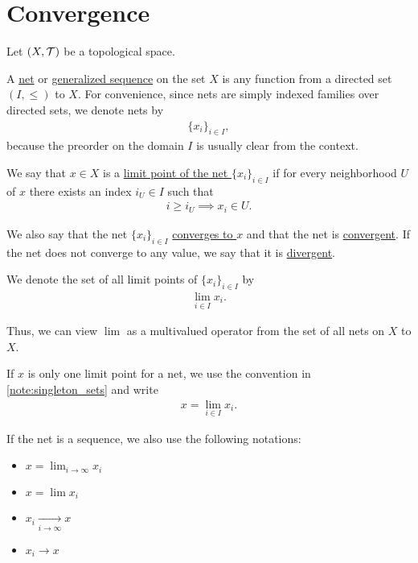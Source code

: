 \section{Convergence}\label{sec:convergence}

Let $(X, \mathcal T)$ be a topological space.

\begin{definition}\label{def:topological_net}\cite[49]{Engelking1989}
  A \ul{net} or \ul{generalized sequence} on the set $X$ is any function from a directed set $(I, \leq)$ to $X$. For convenience, since nets are simply indexed families over directed sets, we denote nets by
  \begin{align*}
    \{ x_i \}_{i \in I},
  \end{align*}
  because the preorder on the domain $I$ is usually clear from the context.
\end{definition}

\begin{definition}\label{def:net_limit_point}\cite[49]{Engelking1989}
  We say that $x \in X$ is a \ul{limit point of the net $\{ x_i \}_{i \in I}$} if for every neighborhood $U$ of $x$ there exists an index $i_U \in I$ such that
  \begin{align*}
    i \geq i_U \implies x_i \in U.
  \end{align*}

  We also say that the net $\{ x_i \}_{i \in I}$ \ul{converges to $x$} and that the net is \ul{convergent}. If the net does not converge to any value, we say that it is \ul{divergent}.

  We denote the set of all limit points of $\{ x_i \}_{i \in I}$ by
  \begin{align*}
    \lim_{i \in I} x_i.
  \end{align*}

  Thus, we can view $\lim$ as a multivalued operator from the set of all nets on $X$ to $X$.

  If $x$ is only one limit point for a net, we use the convention in \cref{note:singleton_sets} and write
  \begin{align*}
    x = \lim_{i \in I} x_i.
  \end{align*}

  If the net is a sequence, we also use the following notations:
  \begin{itemize}
    \item $x = \lim_{i \to \infty} x_i$
    \item $x = \lim x_i$
    \item $x_i \xrightarrow[i \to \infty]{} x$
    \item $x_i \to x$
  \end{itemize}
\end{definition}


